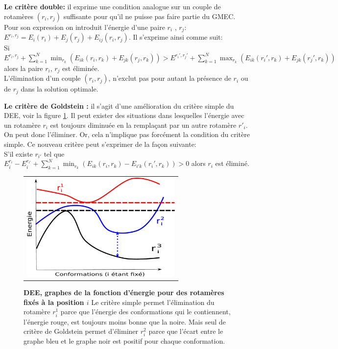 \textbf{Le critère double:} il exprime une condition analogue sur un couple de rotamères $(r_i,r_j)$ suffisante pour qu'il ne puisse pas faire partie du GMEC. Pour son expression on introduit l'énergie d'une paire $r_i$ , $r_j$: $E^{r_i,r_j} = E_i(r_i) + E_j(r_j) + E_{ij}(r_i,r_j)$. Il s'exprime ainsi comme suit:\\
Si\\
$\displaystyle E^{r_i,r_j} + \sum_{k=1}^N \min_{r_k} (E_{ik}(r_i,r_k) + E_{jk}(r_j,r_k)) >  E^{r_i',r_j'} + \sum_{k=1}^N \max_{r_k} (E_{ik}(r_i',r_k) + E_{jk}(r_j',r_k))$ \\
alors la paire $r_i$, $r_j$ est éliminée.\\
L'élimination d'un couple $(r_i,r_j)$, n'exclut pas pour autant la présence de $r_i$ ou de $r_j$ dans la solution optimale. 

\textbf{Le critère de Goldstein \cite{Goldstein94}:} il s'agit d'une amélioration du critère simple du DEE, voir la figure \ref{fig:DEE}. Il peut exister des situations dans lesquelles l'énergie avec un rotamère $r_i$  est toujours diminuée en la remplaçant par un autre rotamère $r'_i$. On peut donc l'éliminer. Or, cela n'implique pas forcément la condition du critère simple. Ce nouveau critère peut s'exprimer de la façon suivante:\\
S'il existe $r_{i'}$ tel que $\displaystyle E_i^{r_i} - E_i^{r_{i'}}+ \sum_{k=1}^N \min_{r_k} (E_{ik}(r_i,r_k) - E_{i'k}(r_i',r_k)) > 0$ alors $r_i$ est éliminé.

   \begin{figure}[!htbp]
     \centering
     \begin{tabular}{c}
       \includegraphics[width=8cm]{figure/DEE.pdf} &
     \end{tabular}
     
     \caption{\textbf{DEE, graphes de la fonction d'énergie pour des rotamères fixés à la position $i$} Le critère simple permet l'élimination du rotamère $r^1_i$ parce que l'énergie des conformations qui le contiennent, l'énergie rouge, est toujours moins bonne que la noire. Mais seul de critère de Goldstein permet d'éliminer $r^2_i$ parce que l'écart entre le graphe bleu et le graphe noir est positif pour chaque conformation.}
\label{fig:DEE}
   \end{figure}

